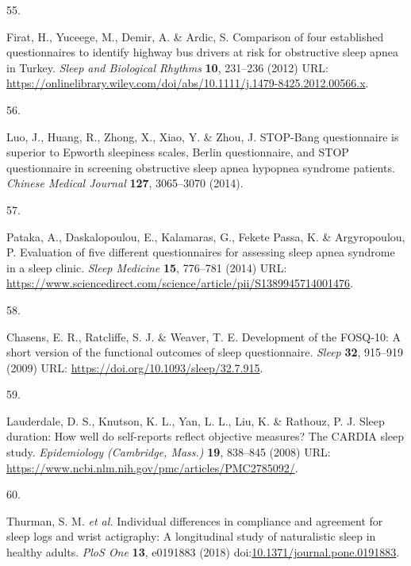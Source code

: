 \documentclass[
  10pt,
]{scrbook}
\newlength{\cslhangindent}
\newlength{\csllabelwidth}
\newlength{\cslentryspacingunit} %
\newenvironment{CSLReferences}[2] %
 {%
  \setlength{\parindent}{0pt}
  \ifodd #1
  \let\oldpar\par
  \def\par{\hangindent=\cslhangindent\oldpar}
  \fi
  \setlength{\parskip}{#2\cslentryspacingunit}
 }%
 {}
\newcommand{\CSLLeftMargin}[1]{\parbox[t]{\csllabelwidth}{#1}}
\newcommand{\CSLRightInline}[1]{\parbox[t]{\linewidth - \csllabelwidth}{#1}\break}
\begin{document}
\begin{CSLReferences}{0}{0}
\leavevmode{}%
\CSLLeftMargin{55. }%
\CSLRightInline{Firat, H., Yuceege, M., Demir, A. \& Ardic, S.
Comparison of four established questionnaires to identify highway bus
drivers at risk for obstructive sleep apnea in Turkey. \emph{Sleep and
Biological Rhythms} \textbf{10}, 231--236 (2012) URL:
\url{https://onlinelibrary.wiley.com/doi/abs/10.1111/j.1479-8425.2012.00566.x}.}

\leavevmode{}%
\CSLLeftMargin{56. }%
\CSLRightInline{Luo, J., Huang, R., Zhong, X., Xiao, Y. \& Zhou, J.
STOP-Bang questionnaire is superior to Epworth sleepiness scales, Berlin
questionnaire, and STOP questionnaire in screening obstructive sleep
apnea hypopnea syndrome patients. \emph{Chinese Medical Journal}
\textbf{127}, 3065--3070 (2014).}

\leavevmode{}%
\CSLLeftMargin{57. }%
\CSLRightInline{Pataka, A., Daskalopoulou, E., Kalamaras, G., Fekete
Passa, K. \& Argyropoulou, P. Evaluation of five different
questionnaires for assessing sleep apnea syndrome in a sleep clinic.
\emph{Sleep Medicine} \textbf{15}, 776--781 (2014) URL:
\url{https://www.sciencedirect.com/science/article/pii/S1389945714001476}.}

\leavevmode{}%
\CSLLeftMargin{58. }%
\CSLRightInline{Chasens, E. R., Ratcliffe, S. J. \& Weaver, T. E.
Development of the FOSQ-10: A short version of the functional outcomes
of sleep questionnaire. \emph{Sleep} \textbf{32}, 915--919 (2009) URL:
\url{https://doi.org/10.1093/sleep/32.7.915}.}

\leavevmode{}%
\CSLLeftMargin{59. }%
\CSLRightInline{Lauderdale, D. S., Knutson, K. L., Yan, L. L., Liu, K.
\& Rathouz, P. J. Sleep duration: How well do self-reports reflect
objective measures? The CARDIA sleep study. \emph{Epidemiology
(Cambridge, Mass.)} \textbf{19}, 838--845 (2008) URL:
\url{https://www.ncbi.nlm.nih.gov/pmc/articles/PMC2785092/}.}

\leavevmode{}%
\CSLLeftMargin{60. }%
\CSLRightInline{Thurman, S. M. \emph{et al.} Individual differences in
compliance and agreement for sleep logs and wrist actigraphy: A
longitudinal study of naturalistic sleep in healthy adults. \emph{PloS
One} \textbf{13}, e0191883 (2018)
doi:\href{https://doi.org/10.1371/journal.pone.0191883}{10.1371/journal.pone.0191883}.}


\end{CSLReferences}
\end{document}
